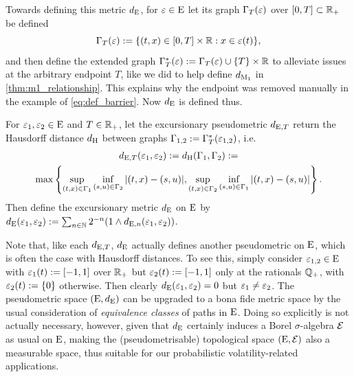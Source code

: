 Towards defining this metric $d_{\mathrm{E}}$, for $\varepsilon\in\mathrm{E}$ let its graph $\Gamma_T(\varepsilon)$ over $[0,T]\subset\mathbb{R}_+$ be defined
\begin{equation}\label{eq:graphs_deriv}
    \Gamma_T(\varepsilon):= \{(t,x)\in[0,T]\times\mathbb{R}:x\in \varepsilon(t)\},
\end{equation}
and then define the extended graph $\Gamma^*_T(\varepsilon):=\Gamma_T(\varepsilon)\cup\{T\}\times\mathbb{R}$ to alleviate issues at the arbitrary endpoint $T$, like we did to help define $d_{\mathrm{M}_1}$ in \autoref{thm:m1_relationship}. This explains why the endpoint was removed manually in the example of \autoref{eq:def_barrier}. Now $d_{\mathrm{E}}$ is defined thus.

\begin{definition}\label{def:excursionary_metric}
    For $\varepsilon_1,\varepsilon_2\in\mathrm{E}$ and $T\in\mathbb{R}_+$, let the excursionary pseudometric $d_{\mathrm{E},T}$ return the Hausdorff distance $d_{\mathrm{H}}$ between graphs $\Gamma_{1,2}:=\Gamma^*_T(\varepsilon_{1,2})$, i.e.~
    \begin{multline}\label{eq:hausdorff_dist}
        d_{\mathrm{E},T}(\varepsilon_1,\varepsilon_2) := d_{\mathrm{H}}(\Gamma_1,\Gamma_2) :=\\ \max\left\{\sup_{(t,x)\in\Gamma_1}\inf_{(s,u)\in\Gamma_2} |(t,x) - (s,u)|,\sup_{(t,x)\in\Gamma_2}\inf_{(s,u)\in\Gamma_1} |(t,x) - (s,u)|\right\}.
    \end{multline}
    Then define the excursionary metric $d_{\mathrm{E}}$ on $\mathrm{E}$ by $d_{\mathrm{E}}(\varepsilon_1,\varepsilon_2):=\sum_{n\in \mathbb{N}}2^{-n}(1\wedge d_{\mathrm{E},n}(\varepsilon_1,\varepsilon_2))$.
\end{definition}

Note that, like each $d_{\mathrm{E},T}$, $d_{\mathrm{E}}$ actually defines another pseudometric on $\mathrm{E}$, which is often the case with Hausdorff distances. To see this, simply consider $\varepsilon_{1,2}\in\mathrm{E}$ with $\varepsilon_1(t):=[-1,1]$ over $\mathbb{R}_+$ but $\varepsilon_2(t):=[-1,1]$ only at the rationals $\mathbb{Q}_+$, with $\varepsilon_2(t):=\{0\}$ otherwise. Then clearly $d_{\mathrm{E}}(\varepsilon_1,\varepsilon_2)=0$ but $\varepsilon_1\neq \varepsilon_2$. The pseudometric space $(\mathrm{E},d_{\mathrm{E}})$ can be upgraded to a bona fide metric space by the usual consideration of \emph{equivalence classes} of paths in $\mathrm{E}$. Doing so explicitly is not actually necessary, however, given that $d_{\mathrm{E}}$ certainly induces a Borel $\sigma$-algebra $\mathcal{E}$ as usual on $\mathrm{E}$, making the (pseudometrisable) topological space $(\mathrm{E},\mathcal{E})$ also a measurable space, thus suitable for our probabilistic volatility-related applications.

